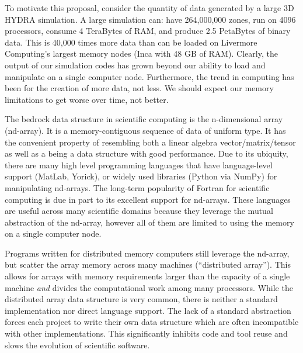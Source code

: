 \documentclass[letterpaper,11pt]{article}
\begin{document}
To motivate this proposal, consider the quantity of data generated
by a large 3D HYDRA simulation.  A large simulation can:
have
	264,000,000 zones,
run on 
	4096 processors,
consume 
	4 TeraBytes of RAM, and
produce 
	2.5 PetaBytes of binary data.
This is 40,000 times more data than can be loaded on Livermore Computing's largest memory nodes (Inca with 48 GB of RAM).%
Clearly, the output of our simulation codes has grown
beyond our ability to load and manipulate on a single computer node.
Furthermore, the trend in computing has been for the creation of more data, not less.  We should
expect our memory limitations to get worse over time, not better.

The bedrock data structure in scientific computing is the n-dimensional array (nd-array).  
It is a memory-contiguous sequence of data of uniform type.  It has the convenient property 
of resembling both a linear algebra vector/matrix/tensor as well as a being a data structure
with good performance.  Due to its ubiquity, there are many high level programming 
languages that have language-level support (MatLab\cite{matlab}, Yorick\cite{Munro1995}), 
or widely used libraries (Python\cite{CPython} via NumPy\cite{Oliphant2006}) for 
manipulating nd-arrays.  The long-term popularity of Fortran for scientific computing is 
due in part to its excellent support for nd-arrays.  These languages are useful across 
many scientific domains because they leverage the mutual abstraction of the nd-array, however
all of them are limited to using the memory on a single computer node.

Programs written for distributed memory computers still leverage the nd-array, but scatter 
the array memory across many machines (``distributed array'').  This allows for arrays 
with memory requirements larger than the capacity of a single machine \emph{and} divides 
the computational work among many processors.  While the distributed array data structure 
is very common, there is neither a standard implementation nor direct language support.  
The lack of a standard abstraction forces each project to write their own data structure 
which are often incompatible with other implementations.  This significantly inhibits code
and tool reuse and slows the evolution of scientific software.
\end{document}

